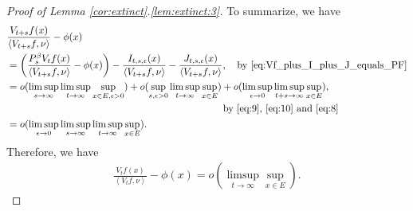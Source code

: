 \documentclass[12pt,a4paper]{amsart}
\numberwithin{equation}{section}
\theoremstyle{plain}
\theoremstyle{definition}
\begin{document}
\begin{proof}[Proof of Lemma \ref{cor:extinct}.\eqref{lem:extinct:3}]
To summarize, we have
\begin{align}
& \frac{V_{t+s}f(x)}{\left\langle V_{t+s}f,\nu \right\rangle} - \phi(x) 
  \\&= \left(\frac{P_s^\beta V_t f (x)}{\left\langle V_{t+s} f,\nu \right\rangle} - \phi(x)\right) - \frac{I_{t,s,\epsilon}(x)}{\left\langle V_{t+s} f,\nu \right\rangle} -\frac{ J_{t,s,\epsilon}(x)}{\left\langle V_{t+s}f,\nu \right\rangle},\quad\text{by~\eqref{eq:Vf_plus_I_plus_J_equals_PF}}
  \\& \begin{multlined} = o(\limsup_{s\to \infty} \limsup_{t\to \infty} \sup_{x\in E, \epsilon > 0}) + o(\sup_{s,\epsilon>0} \limsup_{t\to \infty} \sup_{x\in E}) + o(\limsup_{\epsilon \to 0} \limsup_{t+s \to \infty} \sup_{x\in E}),
\\ \text{by~\eqref{eq:9}, \eqref{eq:10} and \eqref{eq:8}} \end{multlined}
\\& = o(\limsup_{\epsilon \to 0} \limsup_{s\to \infty}\limsup_{t\to \infty} \sup_{x\in E}). 
\end{align}
Therefore, we have
\begin{align}
\frac{V_{t} f(x)}{\left\langle V_t f,\nu \right\rangle} - \phi(x) 
= o(\limsup_{t\to \infty} \sup_{x\in E}).
\end{align}
\end{proof}
\end{document}
